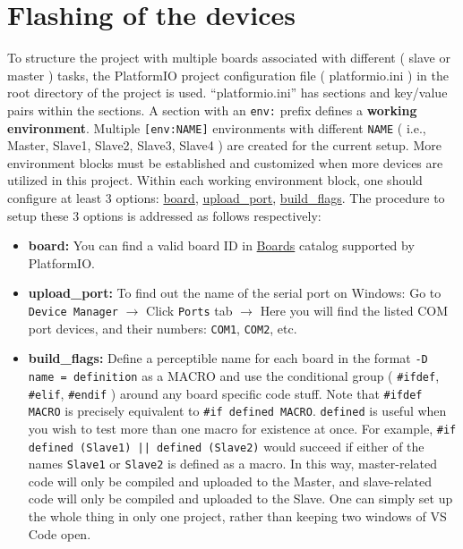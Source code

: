 \documentclass[11pt,a4paper]{article}
\numberwithin{equation}{section}   %
\numberwithin{figure}{section}     %
\numberwithin{table}{section}      %
\begin{document}
\newpage

\section{Flashing of the devices}

To structure the project with multiple boards associated with different ( slave or master ) tasks, the PlatformIO project configuration file ( platformio.ini ) in the root directory of the project is used. ``platformio.ini'' has sections and key/value pairs within the sections. A section with an \texttt{env:} prefix defines a \textbf{working environment}. Multiple \texttt{[env:NAME]} environments with different \texttt{NAME} ( i.e., Master, Slave1, Slave2, Slave3, Slave4 ) are created for the current setup. More environment blocks must be established and customized when more devices are utilized in this project. Within each working environment block, one should configure at least 3 options: \href{https://docs.platformio.org/en/latest/projectconf/section_env_platform.html#board}{board}, \href{https://docs.platformio.org/en/latest/projectconf/section_env_upload.html#upload-port}{upload\_port}, \href{https://docs.platformio.org/en/latest/projectconf/section_env_build.html#build-flags}{build\_flags}. The procedure to setup these 3 options is addressed as follows respectively:

\begin{itemize}

\item \textbf{board:} You can find a valid board ID in \href{https://docs.platformio.org/en/latest/boards/index.html#boards}{Boards} catalog supported by PlatformIO. 

\item \textbf{upload\_port:} To find out the name of the serial port on Windows: Go to \texttt{Device Manager} $\rightarrow$ Click \texttt{Ports} tab $\rightarrow$ Here you will find the listed COM port devices, and their numbers: \texttt{COM1}, \texttt{COM2}, etc.

\item \textbf{build\_flags:} Define a perceptible name for each board in the format \texttt{-D name = definition} as a MACRO and use the conditional group ( \texttt{\#ifdef}, \texttt{\#elif}, \texttt{\#endif} ) around any board specific code stuff.
Note that \texttt{\#ifdef MACRO} is precisely equivalent to \texttt{\#if defined MACRO}. \texttt{defined} is useful when you wish to test more than one macro for existence at once. For example,
\texttt{\#if defined (Slave1) || defined (Slave2)}
would succeed if either of the names \texttt{Slave1} or \texttt{Slave2} is defined as a macro. In this way, master-related code will only be compiled and uploaded to the Master, and slave-related code will only be compiled and uploaded to the Slave. One can simply set up the whole thing in only one project, rather than keeping two windows of VS Code open.

\end{itemize} 
\end{document}
